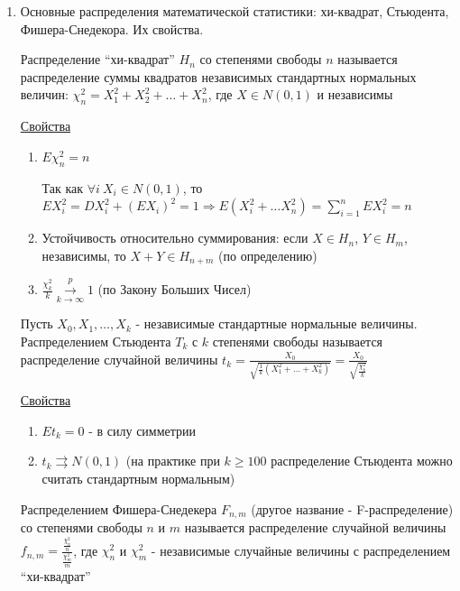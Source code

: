 \begin{enumerate}
    \item Основные распределения математической статистики: хи-квадрат, Стьюдента, Фишера-Снедекора. Их свойства.

    \Def Распределение \enquote{хи-квадрат} $H_n$ со степенями свободы $n$ называется распределение
    суммы квадратов независимых стандартных нормальных величин: $\chi^2_n = X_1^2 + X_2^2 + \dots + X_n^2$, 
    где $X \in N(0, 1)$ и независимы

    \underline{Свойства}

    \begin{enumerate}
        \item $E\chi^2_n = n$

        \begin{MyProof}
            Так как $\forall i \ X_i \in N(0, 1)$, то $E X_i^2 = D X_i^2 + (EX_i)^2 = 1 \Longrightarrow E(X_i^2 + \dots X_n^2) = \sum_{i = 1}^n E X_i^2 = n$
        \end{MyProof}

        \item Устойчивость относительно суммирования: если $X \in H_n$, $Y \in H_m$, независимы, то $X + Y \in H_{n + m}$ (по определению) 


        \item $\frac{\chi_k^2}{k} \overset{p}{\underset{k \to \infty}{\longrightarrow}} 1$ (по Закону Больших Чисел)
    \end{enumerate}

    \Def Пусть $X_0, X_1, \dots, X_k$ - независимые стандартные нормальные величины. 
    Распределением Стьюдента $T_k$ с $k$ степенями свободы называется распределение случайной величины 
    $t_k = \frac{X_0}{\sqrt{\frac{1}{k} (X_1^2 + \dots + X_k^2)}} = \frac{X_0}{\sqrt{\frac{\chi_k^2}{k}}}$

    \underline{Свойства}

    \begin{enumerate}
        \item $Et_k = 0$ - в силу симметрии

        \item $t_k \rightrightarrows N(0, 1)$ (на практике при $k \geq 100$ распределение Стьюдента можно считать стандартным нормальным)
    \end{enumerate}

    \Def Распределением Фишера-Снедекера $F_{n,m}$ (другое название - F-распределение) со степенями свободы $n$ и $m$ называется распределение случайной величины 
    $f_{n,m} = \frac{\frac{\chi^2_n}{n}}{\frac{\chi^2_m}{m}}$, где $\chi_n^2$ и $\chi_m^2$ - независимые случайные величины с распределением \enquote{хи-квадрат}


\end{enumerate}
